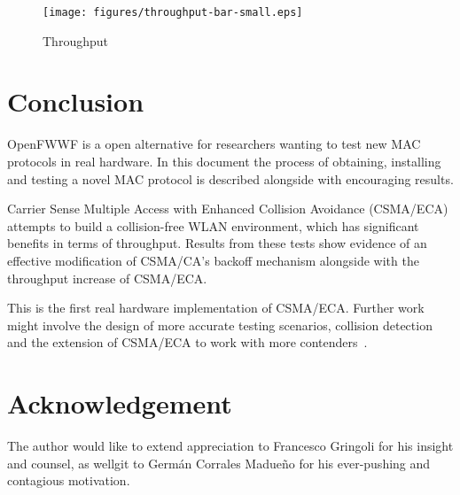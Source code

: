 \documentclass[conference]{IEEEtran}
\begin{document}
\begin{figure}[htbp]
\centering
  \texttt{[image: figures/throughput-bar-small.eps]}
  \caption{Throughput}
  \label{throughput}
\end{figure}

\section{Conclusion}
OpenFWWF is a open alternative for researchers wanting to test new MAC protocols in real hardware. In this document the process of obtaining, installing and testing a novel MAC protocol is described alongside with encouraging results.

Carrier Sense Multiple Access with Enhanced Collision Avoidance (CSMA/ECA) attempts to build a collision-free WLAN environment, which has significant benefits in terms of throughput. Results from these tests show evidence of an effective modification of CSMA/CA's backoff mechanism alongside with the throughput increase of CSMA/ECA.

This is the first real hardware implementation of CSMA/ECA. Further work might involve the design of more accurate testing scenarios, collision detection and the extension of CSMA/ECA to work with more contenders~\cite{research2standards}.

\section{Acknowledgement}
The author would like to extend appreciation to Francesco Gringoli for his insight and counsel, as wellgit  to Germán Corrales Madueño for his ever-pushing and contagious motivation.



\end{document}
